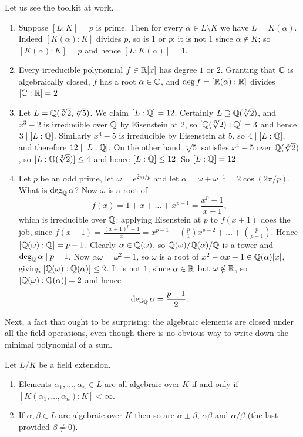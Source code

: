 \documentclass[a4paper]{scrartcl}
\begin{document}
\begin{example}
	Let us see the toolkit at work.
	\begin{enumerate}[label=(\roman*)]
		\item Suppose $[L:K] = p$ is prime. Then for every $\alpha \in L \setminus K$ we have $L = K(\alpha)$. Indeed $[K(\alpha):K]$ divides $p$, so is $1$ or $p$; it is not $1$ since $\alpha \notin K$; so $[K(\alpha):K] = p$ and hence $[L:K(\alpha)] = 1$.
		\item Every irreducible polynomial $f \in \mathbb{R}[x]$ has degree $1$ or $2$. Granting that $\mathbb{C}$ is algebraically closed, $f$ has a root $\alpha \in \mathbb{C}$, and $\deg f = [\mathbb{R}(\alpha):\mathbb{R}]$ divides $[\mathbb{C}:\mathbb{R}] = 2$.
		\item Let $L = \mathbb{Q}(\sqrt[3]{2}, \sqrt[4]{5})$. We claim $[L:\mathbb{Q}] = 12$. Certainly $L \supseteq \mathbb{Q}(\sqrt[3]2)$, and $x^3 - 2$ is irreducible over $\mathbb{Q}$ by Eisenstein at $2$, so $[\mathbb{Q}(\sqrt[3]2):\mathbb{Q}] = 3$ and hence $3 \mid [L:\mathbb{Q}]$. Similarly $x^4 - 5$ is irreducible by Eisenstein at $5$, so $4 \mid [L:\mathbb{Q}]$, and therefore $12 \mid [L:\mathbb{Q}]$. On the other hand $\sqrt[4]{5}$ satisfies $x^4 - 5$ over $\mathbb{Q}(\sqrt[3]2)$, so $[L : \mathbb{Q}(\sqrt[3]{2})] \leq 4$ and hence $[L:\mathbb{Q}] \leq 12$. So $[L:\mathbb{Q}] = 12$.
		\item Let $p$ be an odd prime, let $\omega = e^{2\pi i/p}$ and let $\alpha = \omega + \omega^{-1} = 2\cos(2\pi/p)$. What is $\deg_{\mathbb{Q}} \alpha$? Now $\omega$ is a root of
		$$f(x) = 1 + x + \dots + x^{p-1} = \frac{x^p - 1}{x - 1},$$
		which is irreducible over $\mathbb{Q}$: applying Eisenstein at $p$ to $f(x+1)$ does the job, since $f(x+1) = \frac{(x+1)^p - 1}{x} = x^{p-1} + \binom{p}{1}x^{p-2} + \dots + \binom{p}{p-1}$. Hence $[\mathbb{Q}(\omega):\mathbb{Q}] = p - 1$. Clearly $\alpha \in \mathbb{Q}(\omega)$, so $\mathbb{Q}(\omega)/\mathbb{Q}(\alpha)/\mathbb{Q}$ is a tower and $\deg_{\mathbb{Q}} \alpha \mid p-1$. Now $\alpha \omega = \omega^2 + 1$, so $\omega$ is a root of $x^2 - \alpha x + 1 \in \mathbb{Q}(\alpha)[x]$, giving $[\mathbb{Q}(\omega):\mathbb{Q}(\alpha)] \leq 2$. It is not $1$, since $\alpha \in \mathbb{R}$ but $\omega \notin \mathbb{R}$, so $[\mathbb{Q}(\omega):\mathbb{Q}(\alpha)] = 2$ and hence
		$$\deg_{\mathbb{Q}} \alpha = \frac{p-1}{2}.$$
	\end{enumerate}
\end{example}

Next, a fact that ought to be surprising: the algebraic elements are closed under all the field operations, even though there is no obvious way to write down the minimal polynomial of a sum.

\begin{corollary}\label{cor:algclosed}
	Let $L/K$ be a field extension.
	\begin{enumerate}[label=(\roman*)]
		\item Elements $\alpha_1, \dots, \alpha_n \in L$ are all algebraic over $K$ if and only if $[K(\alpha_1, \dots, \alpha_n) : K] < \infty$.
		\item If $\alpha, \beta \in L$ are algebraic over $K$ then so are $\alpha \pm \beta$, $\alpha\beta$ and $\alpha/\beta$ (the last provided $\beta \neq 0$).
	\end{enumerate}
\end{corollary}
\end{document}
